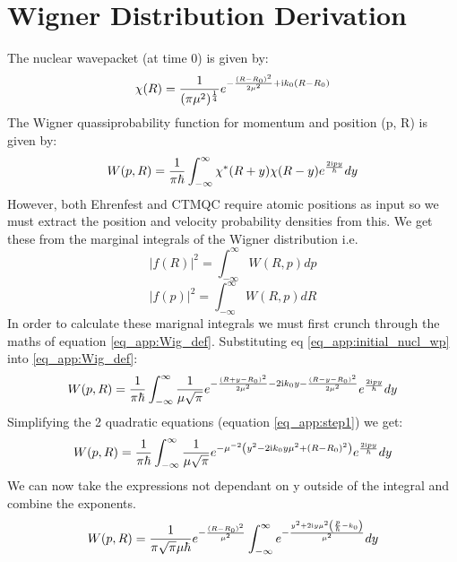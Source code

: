 \chapter{Wigner Distribution Derivation}
\label{app:Wigner}
The nuclear wavepacket (at time 0) is given by:
\begin{equation}
  \chi(R) = \frac{1}{(\pi \mu^2)^{\frac{1}{4}}} e^{-\frac{(R - R_0)^2}{2 \mu^2} + \mathrm{i} k_0 (R - R_0) }
  \label{eq_app:initial_nucl_wp}
\end{equation}
The Wigner quassiprobability function for momentum and position (p, R) is given by:
\begin{equation}
  W(p, R) = \frac{1}{\pi \hbar} \int_{-\infty}^{\infty} \chi^{*}(R + y) \chi(R -y) e^{\frac{2 \mathrm{i} p y}{\hbar}} dy
  \label{eq_app:Wig_def}
\end{equation}
However, both Ehrenfest and CTMQC require atomic positions as input so we must extract the position and velocity probability densities from this. We get these from the marginal integrals of the Wigner distribution i.e.
\begin{equation}
  \vert f(R)\vert^2 = \int^{\infty}_{-\infty} W(R, p) dp
\end{equation}
\begin{equation}
  \vert f(p)\vert^2 = \int^{\infty}_{-\infty} W(R, p) dR
\end{equation}
In order to calculate these marignal integrals we must first crunch through the maths of equation \eqref{eq_app:Wig_def}. Substituting eq \eqref{eq_app:initial_nucl_wp} into \eqref{eq_app:Wig_def}:
\begin{equation}
  W(p, R) = \frac{1}{\pi \hbar} \int_{-\infty}^{\infty} \frac{1}{\mu \sqrt{\pi}} e^{- \frac{(R + y - R_0)^2}{2 \mu^2} - 2\mathrm{i} k_0y - \frac{(R - y - R_0)^2}{2 \mu^2} } e^{\frac{2 \mathrm{i} p y}{\hbar}} dy
  \label{eq_app:step1}
\end{equation}
Simplifying the 2 quadratic equations (equation \eqref{eq_app:step1}) we get:
\begin{equation}
  W(p, R) = \frac{1}{\pi \hbar} \int_{-\infty}^{\infty} \frac{1}{\mu \sqrt{\pi}} e^{-\mu^{-2} \left(y^2 - 2\mathrm{i} k_0y \mu^2 + (R - R_0)^2 \right) } e^{\frac{2 \mathrm{i} p y}{\hbar}} dy
  \label{eq_app:step2}
\end{equation}
We can now take the expressions not dependant on y outside of the integral and combine the exponents.
\begin{equation}
  W(p, R) = \frac{1}{\pi \sqrt{\pi} \mu \hbar} e^{-\frac{(R - R_0)^2}{\mu^2}} \int_{-\infty}^{\infty} e^{-\frac{y^2 + 2 \mathrm{i} y\mu^{2}\left( \frac{p}{\hbar} - k_0\right)}{\mu^{2}}  } dy
  \label{eq_app:step3}
\end{equation}
